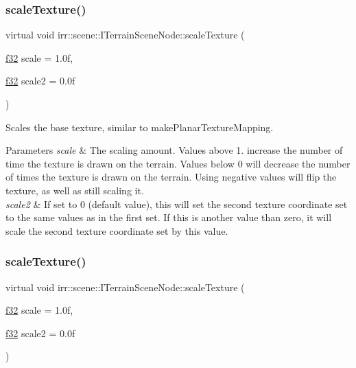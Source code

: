 \subsubsection{\texorpdfstring{scale\+Texture()}{scaleTexture()}\hspace{0.1cm}{\footnotesize\ttfamily [1/2]}}
{\footnotesize\ttfamily virtual void irr\+::scene\+::\+I\+Terrain\+Scene\+Node\+::scale\+Texture (\begin{DoxyParamCaption}\item[{\hyperlink{namespaceirr_a0277be98d67dc26ff93b1a6a1d086b07}{f32}}]{scale = {\ttfamily 1.0f},  }\item[{\hyperlink{namespaceirr_a0277be98d67dc26ff93b1a6a1d086b07}{f32}}]{scale2 = {\ttfamily 0.0f} }\end{DoxyParamCaption})\hspace{0.3cm}{\ttfamily [pure virtual]}}



Scales the base texture, similar to make\+Planar\+Texture\+Mapping. 


\begin{DoxyParams}{Parameters}
{\em scale} & The scaling amount. Values above 1. increase the number of time the texture is drawn on the terrain. Values below 0 will decrease the number of times the texture is drawn on the terrain. Using negative values will flip the texture, as well as still scaling it. \\
\hline
{\em scale2} & If set to 0 (default value), this will set the second texture coordinate set to the same values as in the first set. If this is another value than zero, it will scale the second texture coordinate set by this value. \\
\hline
\end{DoxyParams}
\mbox{\label{classirr_1_1scene_1_1ITerrainSceneNode_aacfb35db09be74e32c22a10c7e13bbcc}} 
\subsubsection{\texorpdfstring{scale\+Texture()}{scaleTexture()}\hspace{0.1cm}{\footnotesize\ttfamily [2/2]}}
{\footnotesize\ttfamily virtual void irr\+::scene\+::\+I\+Terrain\+Scene\+Node\+::scale\+Texture (\begin{DoxyParamCaption}\item[{\hyperlink{namespaceirr_a0277be98d67dc26ff93b1a6a1d086b07}{f32}}]{scale = {\ttfamily 1.0f},  }\item[{\hyperlink{namespaceirr_a0277be98d67dc26ff93b1a6a1d086b07}{f32}}]{scale2 = {\ttfamily 0.0f} }\end{DoxyParamCaption})\hspace{0.3cm}{\ttfamily [pure virtual]}}



